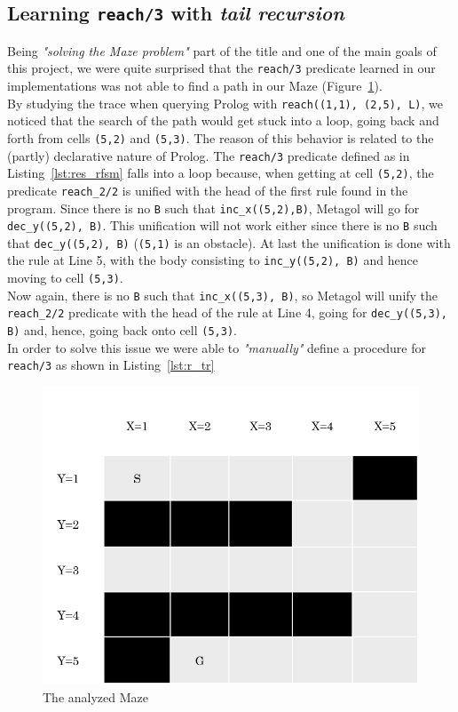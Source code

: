 \subsection{Learning \texttt{reach/3} with \emph{tail recursion}}
Being \emph{"solving the Maze problem"} part of the title and one of the main goals of this project, we were
quite surprised that the \texttt{reach/3} predicate learned in our implementations was not able to find a path
in our Maze (Figure~\ref{fig:our}).\\
By studying the trace when querying Prolog with \texttt{reach((1,1), (2,5), L)},
we noticed that the search of the path would get stuck into a loop, going back and forth from cells \texttt{(5,2)} and
\texttt{(5,3)}. The reason of this behavior is related to the (partly) declarative nature of Prolog. The \texttt{reach/3}
predicate defined as in Listing~\ref{lst:res_rfsm} falls into a loop because, when getting at cell \texttt{(5,2)},
the predicate \texttt{reach\_2/2} is unified with the head of the first rule found in the program. Since there is
no \texttt{B} such that \texttt{inc\_x((5,2),B)}, Metagol will go for \texttt{dec\_y((5,2), B)}. This unification
will not work either since there is no \texttt{B} such that \texttt{dec\_y((5,2), B)} (\texttt{(5,1)} is an obstacle). At
last the unification is done with the rule at Line 5, with the body consisting to \texttt{inc\_y((5,2), B)} and hence moving
to cell \texttt{(5,3)}.\\
Now again, there is no \texttt{B} such that \texttt{inc\_x((5,3), B)}, so Metagol will unify the
\texttt{reach\_2/2} predicate with the head of the rule at Line 4, going for \texttt{dec\_y((5,3), B)} and, hence,
going back onto cell \texttt{(5,3)}.\\

In order to solve this issue we were able to \emph{"manually"} define a procedure for \texttt{reach/3} as shown in Listing~\ref{lst:r_tr}

\begin{figure}
    \centering
    \includegraphics[scale=0.7]{img/ourMaze.png}
    \caption{The analyzed Maze}\label{fig:our}
\end{figure}

